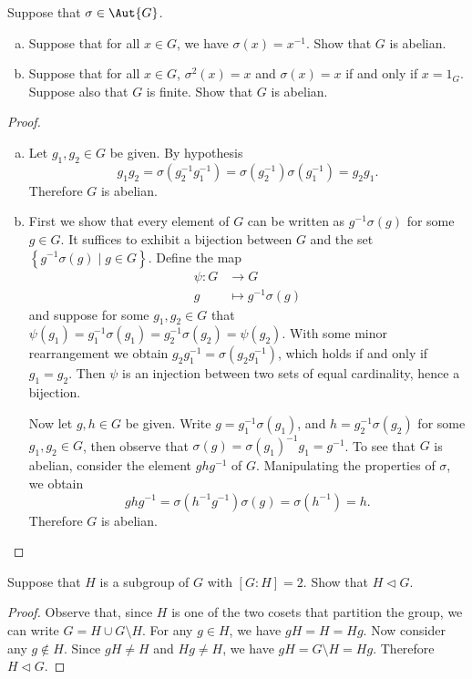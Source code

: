 \documentclass[10pt]{amsart}
\begin{document}
\begin{thm}
  Suppose that $\sigma \in \Aut{G}$.
  \begin{enumerate}[(a)]
  \item
    Suppose that for all $x \in G$, we have $\sigma(x) = x^{-1}.$  Show that $G$ is abelian.
  \item
    Suppose that for all $x \in G$, $\sigma^2(x) = x$ and $\sigma(x) = x$ if and only if $x = 1_G$.
    Suppose also that $G$ is finite.
    Show that $G$ is abelian.
  \end{enumerate}
  \begin{proof}
    \begin{enumerate}[(a)]
    \item
      Let $g_1,g_2 \in G$ be given.
      By hypothesis $$g_1g_2 = \sigma(g_2^{-1}g_1^{-1}) = \sigma(g_2^{-1})\sigma(g_1^{-1}) = g_2g_1.$$
      Therefore $G$ is abelian.
    \item
      First we show that every element of $G$ can be written as $g^{-1}\sigma(g)$ for some $g \in G$.
      It suffices to exhibit a bijection between $G$ and the set $\left\{g^{-1}\sigma(g) \mid g \in G\right\}$.
      Define the map
      \begin{align*}
        \psi \colon G & \rightarrow G\\
        g & \mapsto g^{-1}\sigma(g)
      \end{align*}
      and suppose for some $g_1, g_2 \in G$ that $\psi(g_1) = g_1^{-1}\sigma(g_1) = g_2^{-1}\sigma(g_2) = \psi(g_2)$.
      With some minor rearrangement we obtain $g_2g_1^{-1} = \sigma(g_2g_1^{-1})$, which holds if and only if $g_1 = g_2$.
      Then $\psi$ is an injection between two sets of equal cardinality, hence a bijection.
      
      Now let $g,h \in G$ be given.
      Write $g = g_1^{-1}\sigma(g_1)$, and $h = g_2^{-1}\sigma(g_2)$ for some $g_1,g_2 \in G$, then observe that $\sigma(g) = \sigma(g_1)^{-1}g_1 = g^{-1}$.
      To see that $G$ is abelian, consider the element $ghg^{-1}$ of $G$.
      Manipulating the properties of $\sigma$, we obtain
      $$ghg^{-1} = \sigma(h^{-1}g^{-1})\sigma(g) = \sigma(h^{-1}) = h.$$
      Therefore $G$ is abelian.
      
    \end{enumerate}
  \end{proof}
\end{thm}

\begin{thm}
  Suppose that $H$ is a subgroup of $G$ with $[G : H] = 2$.  Show that $H \lhd G$.
  \begin{proof}
    Observe that, since $H$ is one of the two cosets that partition the group, we can write $G = H \cup G \setminus H$.  
    For any $g \in H$, we have $gH = H = Hg$.
    Now consider any $g \not \in H$.
    Since $gH \not = H$ and $Hg \not = H$, we have $gH = G \setminus H = Hg.$ 
    Therefore $H \lhd G$.
  \end{proof}
\end{thm}
\end{document}
